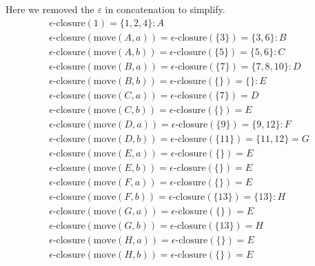 \documentclass[12pt]{article}
\begin{document}
\begin{enumerate}[label=\arabic*.]
Here we removed the $\varepsilon$ in concatenation to simplify.
\begin{align}
	\epsilon\text{-closure}(1)=\{1,2,4\}:A
	\\
	\epsilon\text{-closure}(\text{move}(A,a))=\epsilon\text{-closure}(\{3\})=\{3, 6\}:B
	\\
	\epsilon\text{-closure}(\text{move}(A,b))=\epsilon\text{-closure}(\{5\})=\{5, 6\}:C
	\\
	\epsilon\text{-closure}(\text{move}(B,a))=\epsilon\text{-closure}(\{7\})=\{7, 8, 10\}:D
	\\
	\epsilon\text{-closure}(\text{move}(B,b))=\epsilon\text{-closure}(\{\})=\{\}:E
	\\
	\epsilon\text{-closure}(\text{move}(C,a))=\epsilon\text{-closure}(\{7\})=D
	\\
	\epsilon\text{-closure}(\text{move}(C,b))=\epsilon\text{-closure}(\{\})=E
	\\
	\epsilon\text{-closure}(\text{move}(D,a))=\epsilon\text{-closure}(\{9\})=\{9,12\}:F
	\\
	\epsilon\text{-closure}(\text{move}(D,b))=\epsilon\text{-closure}(\{11\})=\{11,12\}=G
	\\
	\epsilon\text{-closure}(\text{move}(E,a))=\epsilon\text{-closure}(\{\})=E
	\\
	\epsilon\text{-closure}(\text{move}(E,b))=\epsilon\text{-closure}(\{\})=E
	\\
	\epsilon\text{-closure}(\text{move}(F,a))=\epsilon\text{-closure}(\{\})=E
	\\
	\epsilon\text{-closure}(\text{move}(F,b))=\epsilon\text{-closure}(\{13\})=\{13\}:H
	\\
	\epsilon\text{-closure}(\text{move}(G,a))=\epsilon\text{-closure}(\{\})=E
	\\
	\epsilon\text{-closure}(\text{move}(G,b))=\epsilon\text{-closure}(\{13\})=H
	\\
	\epsilon\text{-closure}(\text{move}(H,a))=\epsilon\text{-closure}(\{\})=E
	\\
	\epsilon\text{-closure}(\text{move}(H,b))=\epsilon\text{-closure}(\{\})=E
\end{align}
\end{enumerate}
\end{document}
